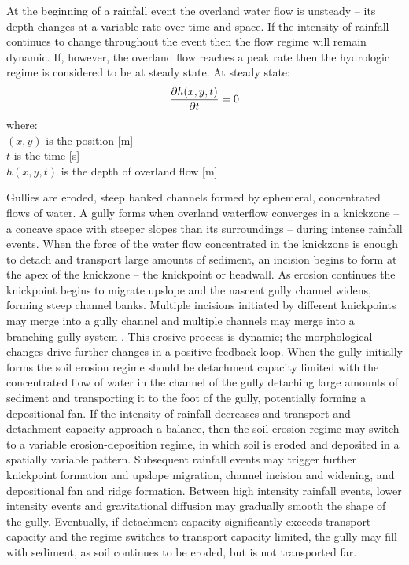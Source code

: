 \documentclass[gmd, manuscript]{copernicus}
\begin{document}
At the beginning of a rainfall event 
the overland water flow is unsteady -- 
its depth changes at a variable rate over time and space. 
If the intensity of rainfall continues to change throughout the event
then the flow regime will remain dynamic. 
If, however, the overland flow reaches a peak rate
then the hydrologic regime is considered to be at steady state.
At steady state:
\begin{equation}
\label{eq:steady_state}
{\partial h(x,y,t) \over \partial t} = 0
\end{equation}
%
{\small
\noindent
where: \\
\noindent
\hspace*{0.5em} $(x,y)$ is the position [\unit{m}]\\
\hspace*{0.5em} $t$ is the time [\unit{s}]\\
\hspace*{0.5em} $h(x,y,t)$ is the depth of overland flow [\unit{m}]\\
}

Gullies are eroded, steep banked channels 
formed by ephemeral, concentrated flows of water.
A gully forms when overland waterflow
converges in a knickzone
-- a concave space with steeper slopes than its surroundings 
\citep{Zahra2017} -- 
during intense rainfall events.  
When the force of the water flow concentrated in the knickzone
is enough to detach and transport large amounts of sediment,
an incision begins to form at the apex of the knickzone 
-- the knickpoint or headwall.
As erosion continues the knickpoint begins to migrate upslope
and the nascent gully channel widens,
forming steep channel banks. 
Multiple incisions initiated by different knickpoints 
may merge into a gully channel
and multiple channels may merge 
into a branching gully system \citep{Mitasova2013}. 
This erosive process is dynamic; 
the morphological changes drive further changes 
in a positive feedback loop.
When the gully initially forms 
the soil erosion regime should be detachment capacity limited
with the concentrated flow of water in the channel of the gully 
detaching large amounts of sediment 
and transporting it to the foot of the gully, 
potentially forming a depositional fan.
If the intensity of rainfall decreases
and transport and detachment capacity 
approach a balance, 
then the soil erosion regime may switch to 
a variable erosion-deposition regime,
in which soil is eroded and deposited 
in a spatially variable pattern.
Subsequent rainfall events may trigger further 
knickpoint formation and upslope migration, 
channel incision and widening, and
depositional fan and ridge formation. 
Between high intensity rainfall events, 
lower intensity events and gravitational diffusion
may gradually smooth the shape of the gully. 
Eventually, if detachment capacity 
significantly exceeds transport capacity
and the regime switches to transport capacity limited, 
the gully may fill with sediment,
as soil continues to be eroded, but is not transported far. 
\end{document}
